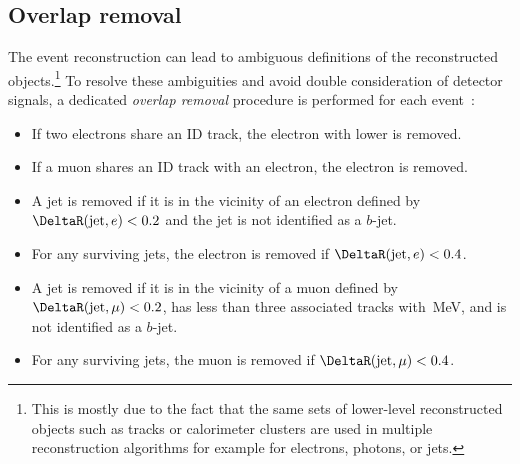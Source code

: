 \subsection{Overlap removal}
\label{subsec:overlap-removal}

The event reconstruction can lead to ambiguous definitions of the reconstructed objects.\footnote{This is mostly due to the fact that the same sets of lower-level reconstructed objects such as tracks or calorimeter clusters are used in multiple reconstruction algorithms for example for electrons, photons, or jets.}
To resolve these ambiguities and avoid double consideration of detector signals, a dedicated \emph{overlap removal} procedure is performed for each event~\cite{HWWPaper}:
\begin{itemize}
    \item If two electrons share an ID track, the electron with lower \ET is removed.
    \item If a muon shares an ID track with an electron, the electron is removed.
    \item A jet is removed if it is in the vicinity of an electron defined by $\DeltaR(\text{jet}, e) < 0.2$ and the jet is not identified as a $b$-jet.
    \item For any surviving jets, the electron is removed if $\DeltaR(\text{jet}, e) < 0.4$.
    \item A jet is removed if it is in the vicinity of a muon defined by $\DeltaR(\text{jet}, \mu) < 0.2$, has less than three associated tracks with \,MeV, and is not identified as a $b$-jet.
    \item For any surviving jets, the muon is removed if $\DeltaR(\text{jet}, \mu) < 0.4$.
\end{itemize}

